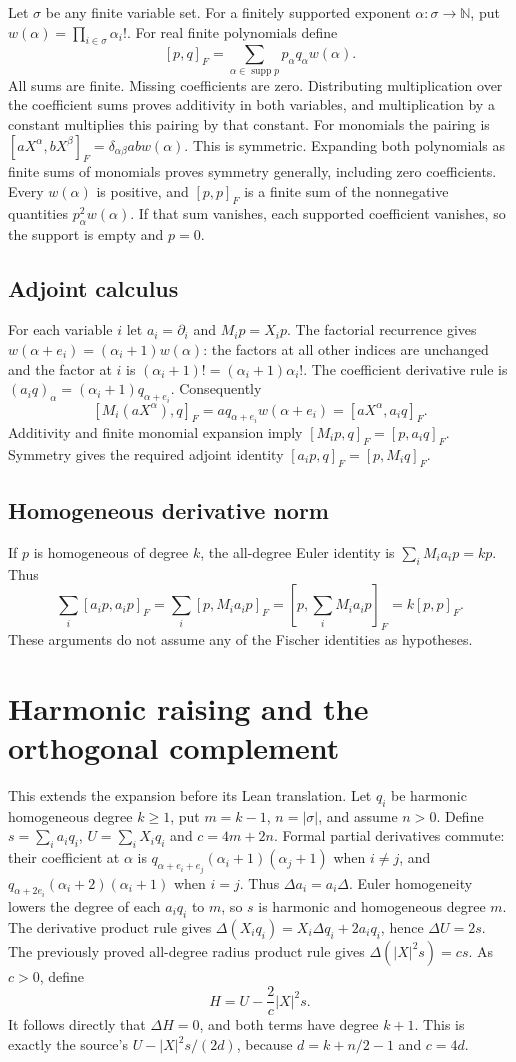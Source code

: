 \documentclass[11pt]{article}
\theoremstyle{definition}
\theoremstyle{remark}
\numberwithin{equation}{section}
\begin{document}
Let $\sigma$ be any finite variable set. For a finitely supported exponent
$\alpha:\sigma\to\mathbb N$, put
$w(\alpha)=\prod_{i\in\sigma}\alpha_i!$. For real finite polynomials define
\[
 [p,q]_F=\sum_{\alpha\in\operatorname{supp}p}
 p_\alpha q_\alpha w(\alpha).
\]
All sums are finite. Missing coefficients are zero. Distributing multiplication
over the coefficient sums proves additivity in both variables, and multiplication
by a constant multiplies this pairing by that constant. For monomials the pairing
is $[aX^\alpha,bX^\beta]_F=\delta_{\alpha\beta}ab w(\alpha)$.
This is symmetric. Expanding both polynomials as finite sums of monomials proves
symmetry generally, including zero coefficients. Every $w(\alpha)$ is positive,
and $[p,p]_F$ is a finite sum of the nonnegative quantities
$p_\alpha^2w(\alpha)$. If that sum vanishes, each supported coefficient vanishes,
so the support is empty and $p=0$.

\subsection{Adjoint calculus}\label{fischer:adjoint}
For each variable $i$ let $a_i=\partial_i$ and $M_i p=X_i p$.
The factorial recurrence gives
$w(\alpha+e_i)=(\alpha_i+1)w(\alpha)$: the factors at all other indices are
unchanged and the factor at $i$ is $(\alpha_i+1)!=(\alpha_i+1)\alpha_i!$.
The coefficient derivative rule is
$(a_i q)_\alpha=(\alpha_i+1)q_{\alpha+e_i}$.
Consequently
\[
 [M_i(aX^\alpha),q]_F
 =a q_{\alpha+e_i}w(\alpha+e_i)
 =[aX^\alpha,a_iq]_F.
\]
Additivity and finite monomial expansion imply $[M_i p,q]_F=[p,a_iq]_F$.
Symmetry gives the required adjoint identity $[a_i p,q]_F=[p,M_iq]_F$.
\subsection{Homogeneous derivative norm}\label{fischer:degree}
If $p$ is homogeneous of degree $k$, the all-degree Euler identity is
$\sum_iM_i a_i p=k p$. Thus
\[
 \sum_i[a_i p,a_i p]_F
 =\sum_i[p,M_i a_i p]_F
 =[p,\sum_iM_i a_i p]_F=k[p,p]_F.
\]
These arguments do not assume any of the Fischer identities as hypotheses.
\section{Harmonic raising and the orthogonal complement}
\label{fischer:raising}
This extends the expansion before its Lean translation. Let $q_i$ be harmonic
homogeneous degree $k\geq1$, put $m=k-1$, $n=|\sigma|$, and assume $n>0$.
Define $s=\sum_i a_iq_i$, $U=\sum_i X_iq_i$ and $c=4m+2n$.
Formal partial derivatives commute: their coefficient at $\alpha$ is
$q_{\alpha+e_i+e_j}(\alpha_i+1)(\alpha_j+1)$ when $i\ne j$, and
$q_{\alpha+2e_i}(\alpha_i+2)(\alpha_i+1)$ when $i=j$.
Thus $\Delta a_i=a_i\Delta$. Euler homogeneity lowers the degree of each
$a_iq_i$ to $m$, so $s$ is harmonic and homogeneous degree $m$.
The derivative product rule gives $\Delta(X_iq_i)=X_i\Delta q_i+2a_iq_i$,
hence $\Delta U=2s$. The previously proved all-degree radius product rule
gives $\Delta(|X|^2s)=c s$. As $c>0$, define
\[
 H=U-\frac{2}{c}|X|^2s.
\]
It follows directly that $\Delta H=0$, and both terms have degree $k+1$.
This is exactly the source's $U-|X|^2s/(2d)$, because
$d=k+n/2-1$ and $c=4d$.
\end{document}
